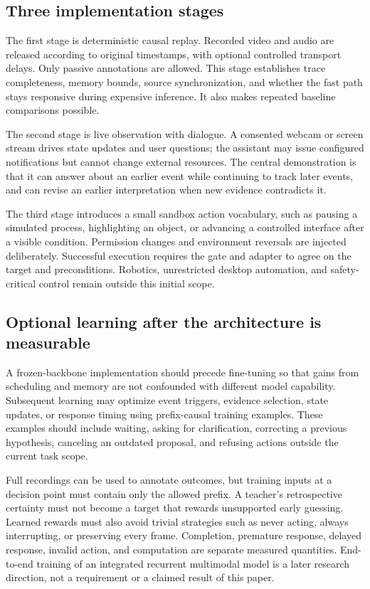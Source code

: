 \documentclass[11pt,letterpaper]{article}
\begin{document}
\subsection{Three implementation stages}
The first stage is deterministic causal replay. Recorded video and audio are released according to original timestamps, with optional controlled transport delays. Only passive annotations are allowed. This stage establishes trace completeness, memory bounds, source synchronization, and whether the fast path stays responsive during expensive inference. It also makes repeated baseline comparisons possible.

The second stage is live observation with dialogue. A consented webcam or screen stream drives state updates and user questions; the assistant may issue configured notifications but cannot change external resources. The central demonstration is that it can answer about an earlier event while continuing to track later events, and can revise an earlier interpretation when new evidence contradicts it.

The third stage introduces a small sandbox action vocabulary, such as pausing a simulated process, highlighting an object, or advancing a controlled interface after a visible condition. Permission changes and environment reversals are injected deliberately. Successful execution requires the gate and adapter to agree on the target and preconditions. Robotics, unrestricted desktop automation, and safety-critical control remain outside this initial scope.

\subsection{Optional learning after the architecture is measurable}
A frozen-backbone implementation should precede fine-tuning so that gains from scheduling and memory are not confounded with different model capability. Subsequent learning may optimize event triggers, evidence selection, state updates, or response timing using prefix-causal training examples. These examples should include waiting, asking for clarification, correcting a previous hypothesis, canceling an outdated proposal, and refusing actions outside the current task scope.

Full recordings can be used to annotate outcomes, but training inputs at a decision point must contain only the allowed prefix. A teacher's retrospective certainty must not become a target that rewards unsupported early guessing. Learned rewards must also avoid trivial strategies such as never acting, always interrupting, or preserving every frame. Completion, premature response, delayed response, invalid action, and computation are separate measured quantities. End-to-end training of an integrated recurrent multimodal model is a later research direction, not a requirement or a claimed result of this paper.
\end{document}
